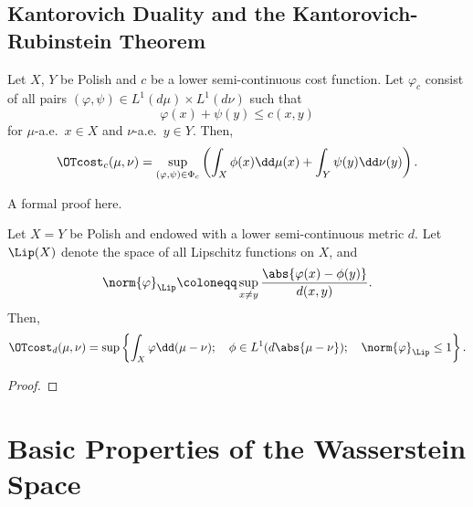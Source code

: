 \documentclass[oneside,reqno,letterpaper]{amsart}
\begin{document}
\subsection{Kantorovich Duality and the Kantorovich-Rubinstein Theorem}

\begin{theorem}
  Let \(X\), \(Y\) be Polish and \(c\) be a lower semi-continuous cost function.
  Let \(\varphi_c\) consist of all pairs \((\varphi, \psi) \in L^1(d\mu) \times L^1(d\nu)\) such that
  \[
    \varphi(x) + \psi(y) \leq c(x, y)
  \]
  for \(\mu\)-a.e.\ \(x \in X\) and \(\nu\)-a.e.\ \(y \in Y\).
  Then,
  \[
    \OTcost_c(\mu, \nu)
    = \sup_{(\varphi, \psi) \in \Phi_c} \left( \int_X \phi(x) \dd \mu(x) + \int_Y \psi(y) \dd \nu(y) \right).
  \]
\end{theorem}
\begin{itodo}
  A formal proof here.
\end{itodo}



\begin{theorem}
  Let \(X = Y\) be Polish and endowed with a lower semi-continuous metric \(d\).
  Let \(\Lip(X)\) denote the space of all Lipschitz functions on \(X\), and
  \[
    \norm{\varphi}_{\Lip}
    \coloneqq \sup_{x \neq y} \frac{\abs{\varphi(x) - \phi(y)}}{d(x, y)}.
  \]
  Then,
  \[
    \OTcost_d(\mu, \nu)
    = \sup\left\{ \int_X \varphi \dd (\mu - \nu); \quad \phi \in L^1(d \abs{\mu - \nu}); \quad \norm{\varphi}_{\Lip} \leq 1 \right\}.
  \]
\end{theorem}
\begin{itodo}
\begin{proof}
\end{proof}
\end{itodo}




\section{Basic Properties of the Wasserstein Space}
\end{document}
